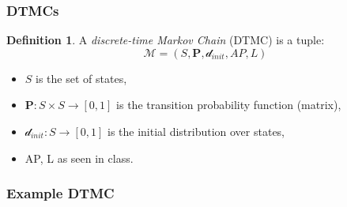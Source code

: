 \documentclass{beamer}
\theoremstyle{definition}
\newtheorem{defn}{Definition}
\begin{document}
\begin{frame}
    \frametitle{DTMCs}
    \begin{defn}
        A \emph{discrete-time Markov Chain} (DTMC)
        is a tuple: $$ \mathcal{M} = (S, \mathbf{P}, \mathcal{d}_{init}, AP, L) $$
        \begin{itemize}
            \item $ S $ is the set of states,
            \item $ \mathbf{P} : S \times S \to [0, 1] $ is the transition probability function (matrix),
            \item $ \mathcal{d}_{init} : S \to [0, 1] $ is the initial distribution over states,
            \item AP, L as seen in class.
        \end{itemize}
    \end{defn}
\end{frame}

\begin{frame}
    \frametitle{Example DTMC}
    \begin{center}
    \end{center}
\end{frame}
\end{document}
